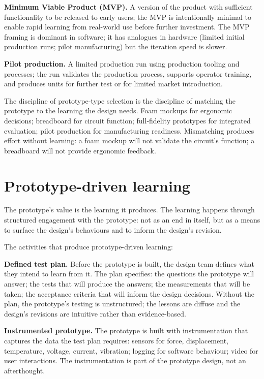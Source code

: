 \textbf{Minimum Viable Product (MVP).} A version of the product with sufficient functionality to be released to early users; the MVP is intentionally minimal to enable rapid learning from real-world use before further investment. The MVP framing is dominant in software; it has analogues in hardware (limited initial production runs; pilot manufacturing) but the iteration speed is slower.

\textbf{Pilot production.} A limited production run using production tooling and processes; the run validates the production process, supports operator training, and produces units for further test or for limited market introduction.

The discipline of prototype-type selection is the discipline of matching the prototype to the learning the design needs. Foam mockups for ergonomic decisions; breadboard for circuit function; full-fidelity prototypes for integrated evaluation; pilot production for manufacturing readiness. Mismatching produces effort without learning: a foam mockup will not validate the circuit's function; a breadboard will not provide ergonomic feedback.

\section{Prototype-driven learning}

The prototype's value is the learning it produces. The learning happens through structured engagement with the prototype: not as an end in itself, but as a means to surface the design's behaviours and to inform the design's revision.

The activities that produce prototype-driven learning:

\textbf{Defined test plan.} Before the prototype is built, the design team defines what they intend to learn from it. The plan specifies: the questions the prototype will answer; the tests that will produce the answers; the measurements that will be taken; the acceptance criteria that will inform the design decisions. Without the plan, the prototype's testing is unstructured; the lessons are diffuse and the design's revisions are intuitive rather than evidence-based.

\textbf{Instrumented prototype.} The prototype is built with instrumentation that captures the data the test plan requires: sensors for force, displacement, temperature, voltage, current, vibration; logging for software behaviour; video for user interactions. The instrumentation is part of the prototype design, not an afterthought.


